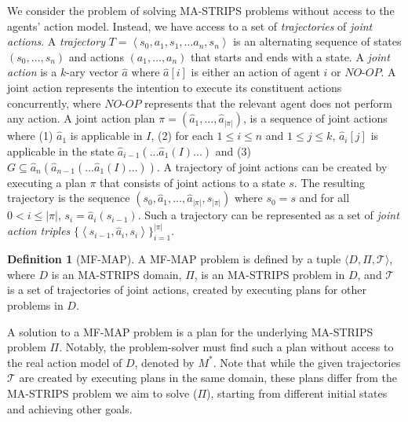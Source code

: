 \documentclass[letterpaper]{article} %
\theoremstyle{definition}
\newtheorem{definition}{Definition}
\theoremstyle{remark}
\newcommand{\tuple}[1]{\ensuremath{\left \langle #1 \right \rangle }}
\newcommand{\realm}{\ensuremath{M^*}\xspace}
\newcommand{\noop}{\textit{NO-OP}\xspace}
\newcommand{\mfmap}{\ac{MF-MAP}\xspace}
\begin{document}
We consider the problem of solving MA-STRIPS problems without access to the agents' action model.
Instead, we have access to a set of \emph{trajectories} of \emph{joint actions}.
A \emph{trajectory} $T=\tuple{s_0, a_1, s_1, \ldots a_n, s_n}$ is an alternating sequence of states $(s_0,\ldots,s_n)$ and actions $(a_1,\ldots,a_n)$ that starts and ends with a state.
A \emph{joint action} is a $k$-ary vector $\hat{a}$ where $\hat{a}[i]$ is either an action of agent $i$ or $\noop$.
A joint action represents the intention to execute its constituent actions concurrently, where $\noop$ represents that the relevant agent does not perform any action.
A joint action plan $\pi=(\hat{a}_1,\ldots,\hat{a}_{|\pi|})$, is a sequence of joint actions where (1) $\hat{a}_1$ is applicable in $I$, (2) for each $1 \leq i \leq n$ and $1 \leq j \leq k$, $\hat{a}_i[j]$ is applicable in the state $\hat{a}_{i-1}(...\hat{a}_1(I)...)$ and (3) $G\subseteq \hat{a}_n(\hat{a}_{n-1}(...\hat{a}_1(I)...))$.
A trajectory of joint actions can be created by executing a plan $\pi$ that consists of joint actions to a state $s$.
The resulting trajectory is the sequence $(s_0, \hat{a}_1, \ldots, \hat{a}_{|\pi|}, s_{|\pi|})$ where $s_0=s$ and for all $0<i\leq |\pi|$, $s_i=\hat{a}_i(s_{i-1})$.
Such a trajectory can be represented as a set of \emph{joint action triples} $\big\{\tuple{s_{i-1},\hat{a}_i,s_i}\big\}_{i=1}^{|\pi|}$.


\begin{definition}[\mfmap]
A \mfmap problem is defined by a tuple
$\langle D, \Pi, \mathcal{T}\rangle$, where $D$ is an MA-STRIPS domain, $\Pi$, is an MA-STRIPS problem in $D$, and $\mathcal{T}$ is a set of trajectories of joint actions, created by executing plans for other problems in $D$.
\end{definition}
A solution to a \mfmap problem is a plan for the underlying MA-STRIPS problem $\Pi$. Notably, the problem-solver must find such a plan without access to the real action model of $D$, denoted by \realm.
Note that while the given trajectories $\mathcal{T}$ are created by executing plans in the same domain, these plans differ from the MA-STRIPS problem we aim to solve ($\Pi$), starting from different initial states and achieving other goals.
\end{document}
